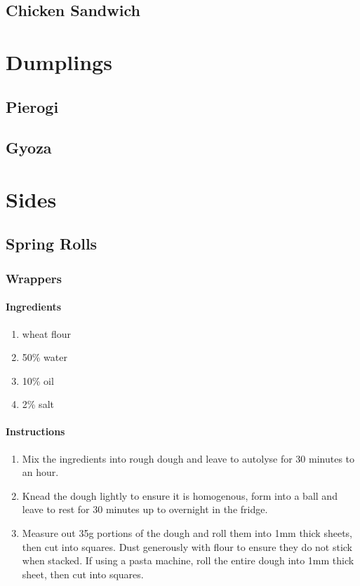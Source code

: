\documentclass[11pt]{report}
\newcommand{\header}[1]{\subsubsection*{#1}}
\begin{document}
\section{Chicken Sandwich}

\chapter{Dumplings}
\section{Pierogi}
\section{Gyoza}

\chapter{Sides}
\section{Spring Rolls}
\subsection{Wrappers}

\header{Ingredients}
\begin{enumerate}
  \item wheat flour
  \item 50\% water
  \item 10\% oil
  \item 2\% salt
\end{enumerate}

\header{Instructions}
\begin{enumerate}
  \item Mix the ingredients into rough dough and leave to autolyse for 30
  minutes to an hour.
  \item Knead the dough lightly to ensure it is homogenous, form into a ball
  and leave to rest for 30 minutes up to overnight in the fridge.
  \item Measure out 35g portions of the dough and roll them into 1mm thick
  sheets, then cut into squares. Dust generously with flour to ensure they do
  not stick when stacked. If using a pasta machine, roll the entire dough into
  1mm thick sheet, then cut into squares.
\end{enumerate}
\end{document}
